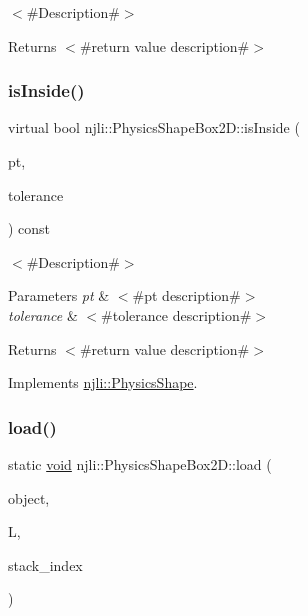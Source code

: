 $<$\#\+Description\#$>$

\begin{DoxyReturn}{Returns}
$<$\#return value description\#$>$ 
\end{DoxyReturn}
\mbox{\label{classnjli_1_1_physics_shape_box2_d_a7275508a58e70148f5c1e0d26b5e1bd6}} 
\subsubsection{\texorpdfstring{is\+Inside()}{isInside()}}
{\footnotesize\ttfamily virtual bool njli\+::\+Physics\+Shape\+Box2\+D\+::is\+Inside (\begin{DoxyParamCaption}\item[{const bt\+Vector3 \&}]{pt,  }\item[{bt\+Scalar}]{tolerance }\end{DoxyParamCaption}) const\hspace{0.3cm}{\ttfamily [virtual]}}

$<$\#\+Description\#$>$


\begin{DoxyParams}{Parameters}
{\em pt} & $<$\#pt description\#$>$ \\
\hline
{\em tolerance} & $<$\#tolerance description\#$>$\\
\hline
\end{DoxyParams}
\begin{DoxyReturn}{Returns}
$<$\#return value description\#$>$ 
\end{DoxyReturn}


Implements \mbox{\hyperlink{classnjli_1_1_physics_shape_a346a118ddc9e6b446ae7a8586fee76fa}{njli\+::\+Physics\+Shape}}.

\mbox{\label{classnjli_1_1_physics_shape_box2_d_a9d71f53154968a269d4cc45feebb106d}} 
\subsubsection{\texorpdfstring{load()}{load()}}
{\footnotesize\ttfamily static \mbox{\hyperlink{_thread_8h_af1e856da2e658414cb2456cb6f7ebc66}{void}} njli\+::\+Physics\+Shape\+Box2\+D\+::load (\begin{DoxyParamCaption}\item[{\mbox{\hyperlink{classnjli_1_1_physics_shape_box2_d}{Physics\+Shape\+Box2D}} \&}]{object,  }\item[{lua\+\_\+\+State $\ast$}]{L,  }\item[{int}]{stack\+\_\+index }\end{DoxyParamCaption})\hspace{0.3cm}{\ttfamily [static]}}

